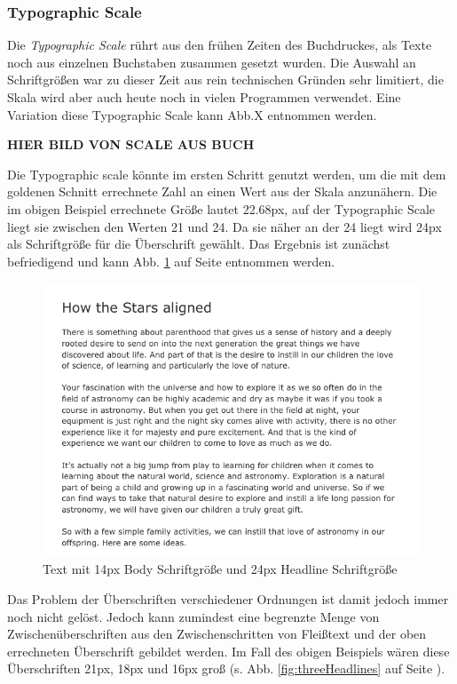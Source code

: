 \subsubsection{Typographic Scale}
Die \textit{Typographic Scale} rührt aus den frühen Zeiten des Buchdruckes, als Texte noch aus einzelnen Buchstaben zusammen gesetzt wurden. Die Auswahl an Schriftgrößen war zu dieser Zeit aus rein technischen Gründen sehr limitiert, die Skala wird aber auch heute noch in vielen Programmen verwendet. Eine Variation diese Typographic Scale kann Abb.X entnommen werden.

\textbf{HIER BILD VON SCALE AUS BUCH}

Die Typographic scale könnte im ersten Schritt genutzt werden, um die mit dem goldenen Schnitt errechnete Zahl an einen Wert aus der Skala anzunähern.
Die im obigen Beispiel errechnete Größe lautet 22.68px, auf der Typographic Scale liegt sie zwischen den Werten 21 und 24. Da sie näher an der 24 liegt wird 24px als Schriftgröße für die Überschrift gewählt. Das Ergebnis ist zunächst befriedigend und kann Abb. \ref{fig:basicHeadline} auf Seite \pageref{fig:basicHeadline} entnommen werden.

\begin{figure}[h]
    \centering
    \includegraphics[width=1\textwidth]{images/Proof-Golden-Ratio.png}
    \caption{Text mit 14px Body Schriftgröße und 24px Headline Schriftgröße}
    \label{fig:basicHeadline}
\end{figure}

Das Problem der Überschriften verschiedener Ordnungen ist damit jedoch immer noch nicht gelöst. Jedoch kann zumindest eine begrenzte Menge von Zwischenüberschriften aus den Zwischenschritten von Fleißtext und der oben errechneten Überschrift gebildet werden. Im Fall des obigen Beispiels wären diese Überschriften 21px, 18px und 16px groß (s. Abb. \ref{fig:threeHeadlines} auf Seite \pageref{fig:threeHeadlines}).

